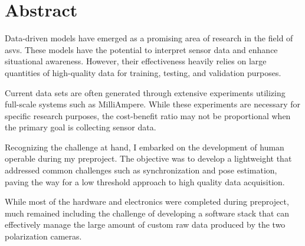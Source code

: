\chapter*{Abstract}

Data-driven models have emerged as a promising area of research in the field of \glspl{asv}.
These models have the potential to interpret sensor data and enhance situational awareness.
However, their effectiveness heavily relies on large quantities of high-quality data for training, testing, and validation purposes.

Current data sets are often generated through extensive experiments utilizing full-scale systems such as MilliAmpere.
While these experiments are necessary for specific research purposes, the cost-benefit ratio may not be proportional when the primary goal is collecting sensor data.

Recognizing the challenge at hand, I embarked on the development of human operable \sr during my preproject.
The objective was to develop a lightweight \sr that addressed common challenges such as synchronization and pose estimation, paving the way for a low threshold approach to high quality data acquisition.

While most of the hardware and electronics were completed during preproject, much remained including the challenge of developing a software stack that can effectively manage the large amount of custom raw data produced by the two polarization cameras.


